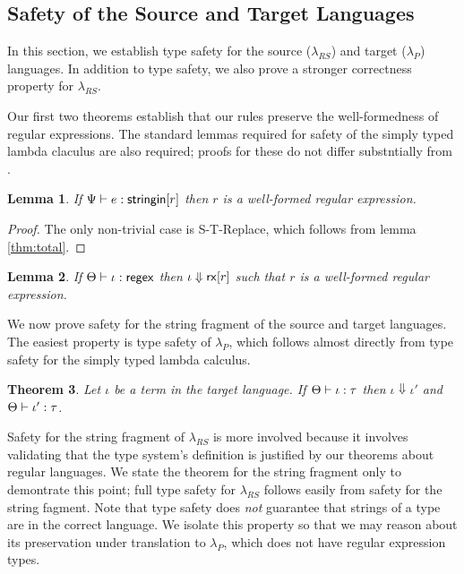 \documentclass[9pt]{sig-alternate}
\newtheorem{thm}{Theorem}
\newtheorem{lem}[thm]{Lemma}
\theoremstyle{definition}
\newcommand{\lambdas}{\lambda_{RS}}
\newcommand{\lambdap}{\lambda_P}
\newcommand{\stringin}[1]{{\sf stringin}[#1]}
\newcommand{\rx}[1]{ {\sf rx}[#1] }
\newcommand{\regex}{{\sf regex}}
\newcommand{\lsubst}[3]{{\tt lsubst}(#1;#2;#3)} %
\newcommand{\treduces}{ \Downarrow }
\newcommand{\sreduces}{ \Downarrow }
\begin{document}







\subsection{Safety of the Source and Target Languages}

In this section, we establish type safety for the source ($\lambdas$) and
target ($\lambdap$) languages. In addition to type safety, we also prove
a stronger correctness property for $\lambdas$.

Our first two theorems establish that our rules preserve the well-formedness of
regular expressions. The standard lemmas required for safety of the simply
typed lambda claculus are also required; proofs for these do not differ substntially
from \cite{pfpl}.

\begin{lem}
  If $\sctx \vdash e : \stringin{r}$ then $r$ is a well-formed regular expression.
\end{lem}
\begin{proof}
  The only non-trivial case is S-T-Replace, which follows from lemma \ref{thm:total}. 
\end{proof}
\begin{lem}
If $\tctx \vdash \iota : \regex$ then $\iota \treduces \rx{r}$ such that $r$ is a well-formed regular expression. 
\end{lem}

We now prove safety for the string fragment of the source and target languages.
The easiest property is type safety of $\lambdap$, which follows almost directly from
type safety for the simply typed lambda calculus.

\begin{thm} 
  Let $\iota$ be a term in the target language. If $\Theta \vdash \iota : \tau$ 
  then $\iota \sreduces \iota'$ and $\Theta \vdash \iota' : \tau$.
\end{thm}

Safety for the string fragment of $\lambdas$ is more involved because it involves validating that
the type system's definition is justified by our theorems about regular languages.
We state the theorem for the string fragment only to demontrate this point;
full type safety for $\lambdas$ follows easily from safety for the string fagment.
Note that type safety does \emph{not} guarantee that strings of a type are in the
correct language. We isolate this property so that we may reason about its preservation
under translation to $\lambdap$, which does not have regular expression types.
\end{document}
